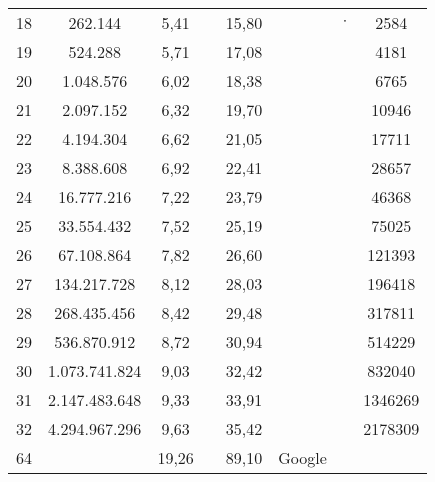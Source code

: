 \documentclass[a4paper,oneside,12pt]{article}
\newenvironment{description*}%
{
\begin{description}
\setlength{\itemsep}{0pt}
\setlength{\parskip}{2pt}
}
{\end{description}}
\begin{document}
\begin{description*}
\begin{tabular}[h]{|c|c|c|c|c|c|c|c|}
       18 &       262.144 & 5,41 &          & 15,80 &                 & $\cdot$ & 2584 \\
       19 &       524.288 & 5,71 &          & 17,08 &                 &         & 4181 \\
       20 &     1.048.576 & 6,02 &          & 18,38 &                 &         & 6765 \\
       21 &     2.097.152 & 6,32 &          & 19,70 &                 &         & 10946 \\
       22 &     4.194.304 & 6,62 &          & 21,05 &                 &         & 17711 \\
       23 &     8.388.608 & 6,92 &          & 22,41 &                 &         & 28657 \\
       24 &    16.777.216 & 7,22 &          & 23,79 &                 &         & 46368 \\
       25 &    33.554.432 & 7,52 &          & 25,19 &                 &         & 75025 \\
       26 &    67.108.864 & 7,82 &          & 26,60 &                 &         & 121393 \\
       27 &   134.217.728 & 8,12 &          & 28,03 &                 &         & 196418 \\
       28 &   268.435.456 & 8,42 &          & 29,48 &                 &         & 317811 \\
       29 &   536.870.912 & 8,72 &          & 30,94 &                 &         & 514229 \\
       30 & 1.073.741.824 & 9,03 &          & 32,42 &                 &         & 832040 \\
       31 & 2.147.483.648 & 9,33 &          & 33,91 &                 &         & 1346269 \\
       32 & 4.294.967.296 & 9,63 &          & 35,42 &                 &         & 2178309 \\
       64 &              & 19,26 &          & 89,10 & Google          &         &  \\ \hline
    \end{tabular} \\[12pt]


\end{description*}
\end{document}
